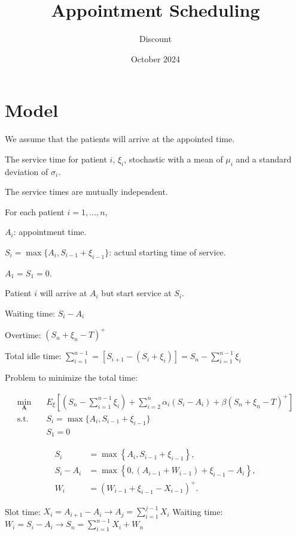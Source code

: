 \documentclass{article}
\title{Appointment Scheduling}
\author{Discount}
\date{October 2024}
\begin{document}
\maketitle

\section{Model}
We assume that the patients will arrive at the appointed time.

The service time for patient $i$, $\xi_{i}$, stochastic with a mean of $\mu_{i}$ and a standard deviation of $\sigma_{i}$.

The service times are mutually independent.

For each patient $i = 1, \ldots, n$, 

$A_{i}$: appointment time.

$S_{i} = \max\{A_{i}, S_{i-1} + \xi_{i-1}\}$: actual starting time of service.

$A_{1} = S_{1} = 0$.

Patient $i$ will arrive at $A_{i}$ but start service at $S_{i}$.

Waiting time: $S_{i} - A_{i}$

Overtime: $(S_{n} +\xi_{n} - T)^{+}$

Total idle time: $\sum_{i=1}^{n-1} = [S_{i+1} - (S_{i} + \xi_{i})] = S_{n} - \sum_{i=1}^{n-1} \xi_{i}$

Problem to minimize the total time:

\begin{equation}
    \begin{aligned}
        \min_{\mathbf{A}} \quad & E_{\xi}\left[\left(S_n-\sum_{i=1}^{n-1} \xi_i\right)+\sum_{i=2}^n \alpha_i \left(S_i-A_i\right) + \beta(S_{n} +\xi_{n} - T)^{+} \right] \\
        \mbox{s.t.} \quad & S_{i} = \max\{A_{i}, S_{i-1} + \xi_{i-1}\} \\
        & S_{1} = 0
    \end{aligned}
\end{equation}

\begin{align}
    S_i & =\max \left\{A_i, S_{i-1}+\xi_{i-1}\right\}, \\
    S_i-A_i & =\max \left\{0,\left(A_{i-1}+W_{i-1}\right)+\xi_{i-1}-A_i\right\}, \\
    W_i & =\left(W_{i-1}+\xi_{i-1}-X_{i-1}\right)^{+}.
\end{align}

Slot time: $X_i = A_{i+1} - A_{i} \rightarrow A_{j} = \sum_{i=1}^{j-1} X_{i}$
Waiting time: $W_{i} = S_{i} - A_{i} \rightarrow S_{n} = \sum_{i=1}^{n-1} X_{i} + W_{n}$
\end{document}
